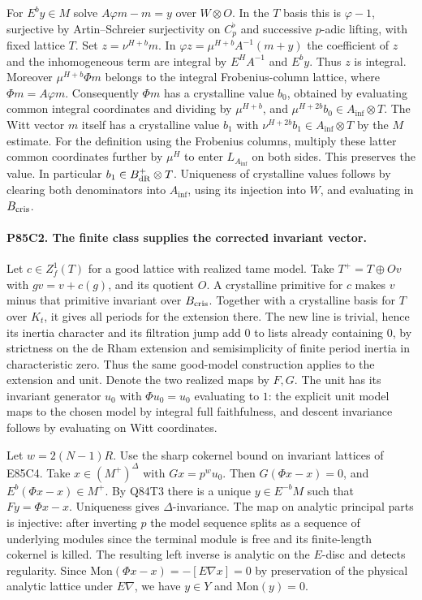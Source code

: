 For $E^b y\in M$ solve $A\varphi m-m=y$ over $W\otimes O$.
In the $T$ basis this is $\varphi-1$, surjective by
Artin--Schreier surjectivity on $C_p^\flat$ and successive
$p$-adic lifting, with fixed lattice $T$. Set $z=\nu^{H+b}m$.
In $\varphi z=\mu^{H+b}A^{-1}(m+y)$ the coefficient of $z$
and the inhomogeneous term are integral by $E^HA^{-1}$ and
$E^b y$. Thus $z$ is integral. Moreover $\mu^{H+b}\Phi m$
belongs to the integral Frobenius-column lattice, where
$\Phi m=A\varphi m$. Consequently $\Phi m$ has a crystalline
value $b_0$, obtained by evaluating common integral coordinates
and dividing by $\mu^{H+b}$, and
$\mu^{H+2b}b_0\in A_{\inf}\otimes T$. The Witt vector $m$ itself
has a crystalline value $b_1$ with
$\nu^{H+2b} b_1\in A_{\inf}\otimes T$ by the $M$ estimate.
For the definition using the Frobenius columns, multiply
these latter common coordinates further by $\mu^H$ to enter
$L_{A_{\inf}}$ on both sides. This preserves the value.
In particular $b_1\in B_{\rm dR}^+\otimes T$. Uniqueness of
crystalline values follows by clearing both denominators into
$A_{\inf}$, using its injection into $W$, and evaluating in
$B_{\rm cris}$.

\paragraph{P85C2. The finite class supplies the corrected invariant vector.}
Let $c\in Z_f^1(T)$ for a good lattice with realized tame model.
Take $T^+=T\oplus O v$ with $gv=v+c(g)$, and its quotient $O$.
A crystalline primitive for $c$ makes $v$ minus that primitive
invariant over $B_{\rm cris}$. Together with a crystalline basis
for $T$ over $K_t$, it gives all periods for the extension there.
The new line is trivial, hence its inertia character and its
filtration jump add $0$ to lists already containing $0$, by
strictness on the de Rham extension and semisimplicity of finite
period inertia in characteristic zero. Thus the same good-model
construction applies to the extension and unit. Denote the two
realized maps by $F,G$. The unit has its invariant generator $u_0$
with $\Phi u_0=u_0$ evaluating to $1$: the explicit unit model
maps to the chosen model by integral full faithfulness, and
descent invariance follows by evaluating on Witt coordinates.

Let $w=2(N-1)R$. Use the sharp cokernel bound on invariant lattices
of E85C4. Take
$x\in(M^+)^\Delta$ with $Gx=p^w u_0$. Then $G(\Phi x-x)=0$,
and $E^b(\Phi x-x)\in M^+$. By Q84T3 there is a unique
$y\in E^{-b}M$ such that $Fy=\Phi x-x$. Uniqueness gives
$\Delta$-invariance. The map on analytic principal parts is
injective: after inverting $p$ the model sequence splits as a
sequence of underlying modules since the terminal module is
free and its finite-length cokernel is killed. The resulting
left inverse is analytic on the $E$-disc and detects regularity.
Since $\mathrm{Mon}(\Phi x-x)=-[E\nabla x]=0$ by preservation of
the physical analytic lattice under $E\nabla$, we have
$y\in Y$ and $\mathrm{Mon}(y)=0$.

